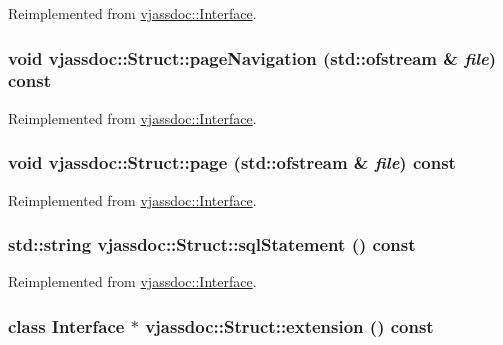 Reimplemented from \hyperlink{classvjassdoc_1_1Interface_e10d2a4a6acf44897145bf76675b9da1}{vjassdoc::Interface}.\hypertarget{classvjassdoc_1_1Struct_c415c5b26f7385a990339dfbfbbca5dc}{
\subsubsection{\setlength{\rightskip}{0pt plus 5cm}void vjassdoc::Struct::pageNavigation (std::ofstream \& {\em file}) const}}
\label{classvjassdoc_1_1Struct_c415c5b26f7385a990339dfbfbbca5dc}




Reimplemented from \hyperlink{classvjassdoc_1_1Interface_f0acc07a23eb46eb9f065fb47d55f1a5}{vjassdoc::Interface}.\hypertarget{classvjassdoc_1_1Struct_bd918c5a1ec7defe1849f4b4e61523f2}{
\subsubsection{\setlength{\rightskip}{0pt plus 5cm}void vjassdoc::Struct::page (std::ofstream \& {\em file}) const}}
\label{classvjassdoc_1_1Struct_bd918c5a1ec7defe1849f4b4e61523f2}




Reimplemented from \hyperlink{classvjassdoc_1_1Interface_79ed4ee7fd055e3b53fdb9b14749fa0f}{vjassdoc::Interface}.\hypertarget{classvjassdoc_1_1Struct_227d826acdbbe1702941634c90ab7e4e}{
\subsubsection{\setlength{\rightskip}{0pt plus 5cm}std::string vjassdoc::Struct::sqlStatement () const}}
\label{classvjassdoc_1_1Struct_227d826acdbbe1702941634c90ab7e4e}




Reimplemented from \hyperlink{classvjassdoc_1_1Interface_93fbe7323df0502111e576c08376b726}{vjassdoc::Interface}.\hypertarget{classvjassdoc_1_1Struct_92ef4086c680565cd9c5766607d8a560}{
\subsubsection{\setlength{\rightskip}{0pt plus 5cm}class {\bf Interface} $\ast$ vjassdoc::Struct::extension () const}}
\label{classvjassdoc_1_1Struct_92ef4086c680565cd9c5766607d8a560}


